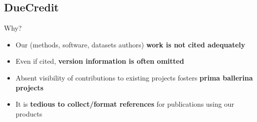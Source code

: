 %
%
%
%
%
%
%

\subsection{DueCredit}

\newcommand{\duecredititem}[1]{\begin{flushright}\textcolor{red}{\emph{#1}}\end{flushright}}

\begin{frame}{Why?} %
    \begin{itemize}
    \item Our (methods, software, datasets authors) \textbf{work is
        not cited adequately}
    \item Even if cited, \textbf{version information is often omitted}
    \item Absent visibility of contributions to existing projects
      fosters \textbf{prima ballerina projects}
    \item It is \textbf{tedious to collect/format references} for
      publications using our products
    \end{itemize}
\end{frame}

